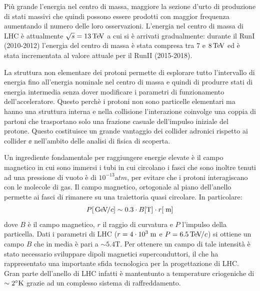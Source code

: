 Pi\`u grande l'energia nel centro di massa, maggiore la sezione d'urto di produzione di stati massivi che quindi possono essere prodotti con maggior frequenza aumentando il numero delle loro osservazioni. L'energia nel centro di massa di LHC \`e attualmente $\sqrt{s}=13{\rm \, Te\kern-0.125em V}$ a cui si \`e arrivati gradualmente: durante il RunI (2010-2012) l'energia del centro di massa \`e stata compresa tra 7 e $8{\rm \, Te\kern-0.125em V}$ ed \`e stata incrementata al valore attuale per il RunII (2015-2018).  

La struttura non elementare dei protoni permette di esplorare tutto l'intervallo di energia fino all'energia nominale nel centro di massa e quindi di produrre stati di energia intermedia senza dover modificare i parametri di funzionamento dell'acceleratore. Questo perchè i protoni non sono particelle elementari ma hanno una struttura interna e nella collisione l'interazione coinvolge una coppia di partoni che trasportano solo una frazione casuale dell'impulso iniziale del protone. Questo costituisce un grande vantaggio dei collider adronici rispetto ai collider $\ee$ nell'ambito delle analisi di fisica di scoperta.


Un ingrediente fondamentale per raggiungere energie elevate \`e il campo magnetico in cui sono immersi i tubi in cui circolano i fasci che sono inoltre tenuti ad una pressione di vuoto è di $10^{-13}{\mathrm atm}$, per evitare che i protoni interagiscano con le molecole di gas. Il campo magnetico, ortogonale al piano dell'anello permette ai fasci di rimanere su una traiettoria quasi circolare. In particolare:
\begin{equation}
P[{\rm \, Ge\kern-0.125em V}\kern-0.125em /c] \sim 0.3 \cdot B[{\mathrm T}] \cdot r[\rm \; m]
\end{equation}
dove $B$ è il campo magnetico, $r$ il raggio di curvatura e $P$ l'impulso della particella. Dati i parametri di LHC ($r= 4 \cdot 10^3\rm \; m$ e $P=6.5{\rm \, Te\kern-0.125em V}\kern-0.125em /c$) si ottiene un campo $B$ che in media è pari a $\sim 5.4{\mathrm T}$. Per ottenere un campo di tale intensit\`a è stato necessario sviluppare dipoli magnetici superconduttori, il che ha rappresentato una importante sfida tecnologica per la progettazione di LHC. Gran parte dell'anello di LHC infatti \`e mantentunto a temperature criogeniche di $\sim 2^\circ {\mathrm K}$ grazie ad un complesso sistema di raffreddamento.

